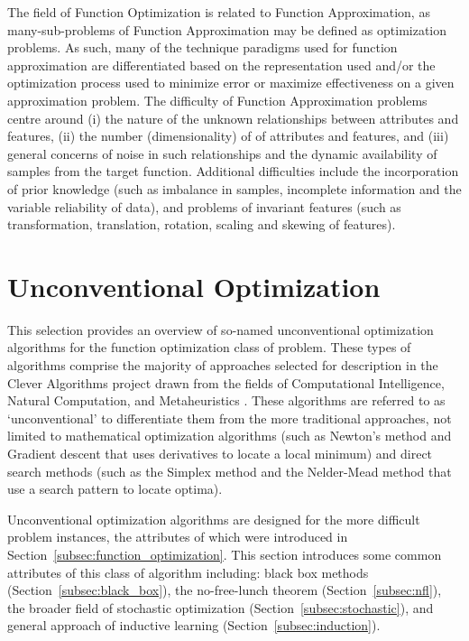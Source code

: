 The field of Function Optimization is related to Function Approximation, as many-sub-problems of Function Approximation may be defined as optimization problems. As such, many of the technique paradigms used for function approximation are differentiated based on the representation used and/or the optimization process used to minimize error or maximize effectiveness on a given approximation problem. 
The difficulty of Function Approximation problems centre around (i) the nature of the unknown relationships between attributes and features, (ii) the number (dimensionality) of of attributes and features, and (iii) general concerns of noise in such relationships and the dynamic availability of samples from the target function.
Additional difficulties include the incorporation of prior knowledge (such as imbalance in samples, incomplete information and the variable reliability of data), and problems of invariant features (such as transformation, translation, rotation, scaling and skewing of features).


% 
% 
\section{Unconventional Optimization}
\label{sec:unconventional_optimization}
This selection provides an overview of so-named unconventional optimization algorithms for the function optimization class of problem. These types of algorithms comprise the majority of approaches selected for description in the Clever Algorithms project drawn from the fields of Computational Intelligence, Natural Computation, and Metaheuristics \cite{Brownlee2010b}. 
These algorithms are referred to as `unconventional' to differentiate them from the more traditional approaches, not limited to mathematical optimization algorithms (such as Newton's method and Gradient descent that uses derivatives to locate a local minimum) and direct search methods (such as the Simplex method and the Nelder-Mead method that use a search pattern to locate optima).

Unconventional optimization algorithms are designed for the more difficult problem instances, the attributes of which were introduced in Section~\ref{subsec:function_optimization}. This section introduces some common attributes of this class of algorithm including: black box methods (Section~\ref{subsec:black_box}), the no-free-lunch theorem (Section~\ref{subsec:nfl}), the broader field of stochastic optimization (Section~\ref{subsec:stochastic}), and general approach of inductive learning (Section~\ref{subsec:induction}).

